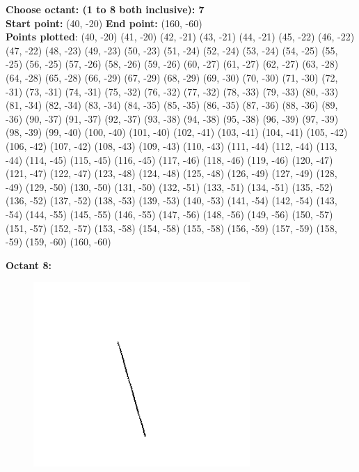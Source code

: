 \documentclass[12pt,letterpaper]{article}
\begin{document}
\textbf{Choose octant: (1 to 8 both inclusive): 7}\\
\textbf{Start point:} (40, -20)
\textbf{End point:} (160, -60)\\
\textbf{Points plotted}:
(40, -20) (41, -20) (42, -21) (43, -21) 
(44, -21) (45, -22) (46, -22) (47, -22) 
(48, -23) (49, -23) (50, -23) (51, -24) 
(52, -24) (53, -24) (54, -25) (55, -25) 
(56, -25) (57, -26) (58, -26) (59, -26) 
(60, -27) (61, -27) (62, -27) (63, -28) 
(64, -28) (65, -28) (66, -29) (67, -29) 
(68, -29) (69, -30) (70, -30) (71, -30) 
(72, -31) (73, -31) (74, -31) (75, -32) 
(76, -32) (77, -32) (78, -33) (79, -33) 
(80, -33) (81, -34) (82, -34) (83, -34) 
(84, -35) (85, -35) (86, -35) (87, -36) 
(88, -36) (89, -36) (90, -37) (91, -37) 
(92, -37) (93, -38) (94, -38) (95, -38) 
(96, -39) (97, -39) (98, -39) (99, -40) 
(100, -40) (101, -40) (102, -41) (103, -41) 
(104, -41) (105, -42) (106, -42) (107, -42) 
(108, -43) (109, -43) (110, -43) (111, -44) 
(112, -44) (113, -44) (114, -45) (115, -45) 
(116, -45) (117, -46) (118, -46) (119, -46) 
(120, -47) (121, -47) (122, -47) (123, -48) 
(124, -48) (125, -48) (126, -49) (127, -49) 
(128, -49) (129, -50) (130, -50) (131, -50) 
(132, -51) (133, -51) (134, -51) (135, -52) 
(136, -52) (137, -52) (138, -53) (139, -53) 
(140, -53) (141, -54) (142, -54) (143, -54) 
(144, -55) (145, -55) (146, -55) (147, -56) 
(148, -56) (149, -56) (150, -57) (151, -57) 
(152, -57) (153, -58) (154, -58) (155, -58) 
(156, -59) (157, -59) (158, -59) (159, -60) 
(160, -60) 

\newpage
\textbf{Octant 8:}
\begin{figure}[h]
    \centering
    \includegraphics[height=7cm]{Outputs/O8-1.png}
\end{figure}
\end{document}

